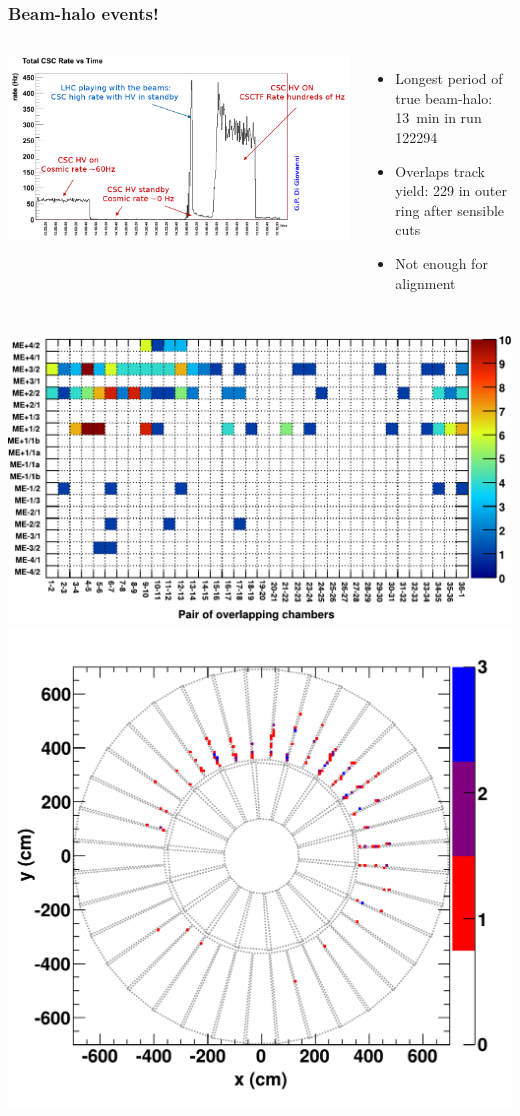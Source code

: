 \documentclass[compress]{beamer}
\begin{document}
\begin{frame}
\frametitle{Beam-halo events!}
\begin{columns}
\includegraphics[width=\linewidth]{trigger_plot.png}

\begin{itemize}\setlength{\itemsep}{-0.05 cm}
\item Longest period of true beam-halo: 13~min in run 122294
\item Overlaps track yield: 229 in outer ring after sensible cuts
\item Not enough for alignment
\end{itemize}
\end{columns}

\vspace{-0.3 cm}
\includegraphics[height=4 cm]{occupancy_121964_122294.pdf}
\includegraphics[height=4.5 cm]{overlaps_xypos_121964_122294.pdf}
\end{frame}
\end{document}
